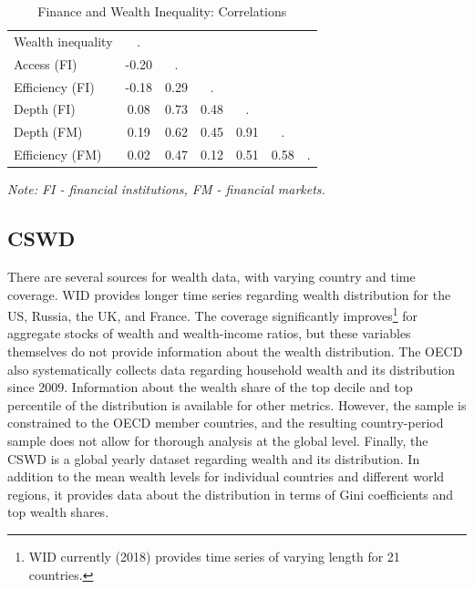 \begin{refsection}
%
%
\begin{table}[ht!]
\small
\centering
\caption{Finance and Wealth Inequality: Correlations}
\label{ch3tab:corrmat}
\begin{threeparttable}
\begin{tabular}{lcccccc}
  \toprule
  Wealth inequality & . &  & & & & \\
  Access (FI)  & -0.20 & . &  & & &    \\ 
  Efficiency (FI) & -0.18 & 0.29 & . & & &  \\ 
  Depth (FI)  & 0.08 & 0.73 & 0.48 & . &  &   \\ 
  Depth (FM)  & 0.19 & 0.62 & 0.45 & 0.91 & . &   \\ 
  Efficiency (FM)  & 0.02 & 0.47 & 0.12 & 0.51 & 0.58 & .   \\ 
  \bottomrule
\end{tabular}
\begin{tablenotes}
\footnotesize
\item \textit{Note: FI - financial institutions, FM - financial markets.}
\end{tablenotes}
\end{threeparttable}
\end{table}
%
%

\subsection{\ac{CSWD}}\label{ch3subsec:cswd}
There are several sources for wealth data, with varying country and time coverage. \ac{WID} provides longer time series regarding wealth distribution for the US, Russia, the UK, and France. The coverage significantly improves\footnote{\ac{WID} currently (2018) provides time series of varying length for 21 countries.} for aggregate stocks of wealth and wealth-income ratios, but these variables themselves do not provide information about the wealth distribution. The \ac{OECD} also systematically collects data regarding household wealth and its distribution since 2009. Information about the wealth share of the top decile and top percentile of the distribution is available for other metrics. However, the sample is constrained to the \ac{OECD} member countries, and the resulting country-period sample does not allow for thorough analysis at the global level. Finally, the \ac{CSWD} is a global yearly dataset regarding wealth and its distribution. In addition to the mean wealth levels for individual countries and different world regions, it provides data about the distribution in terms of Gini coefficients and top wealth shares.


\end{refsection}

